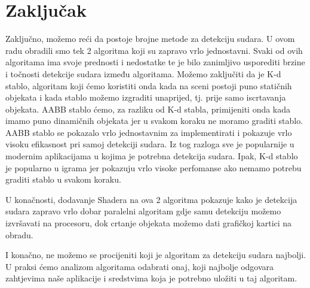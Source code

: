 \chapter{Zaključak}

Zaključno, možemo reći da postoje brojne metode za detekciju sudara. U ovom radu
obradili smo tek 2 algoritma koji su zapravo vrlo jednostavni. Svaki od ovih algoritama ima svoje prednosti i nedostatke te je bilo zanimljivo usporediti brzine i točnosti detekcije sudara između algoritama. Možemo zaključiti da je K-d stablo, algoritam koji ćemo koristiti onda kada na sceni postoji puno statičnih objekata i kada stablo možemo izgraditi unaprijed, tj. prije samo iscrtavanja objekata. AABB stablo ćemo, za razliku od K-d stabla, primijeniti onda kada imamo puno dinamičnih objekata jer u svakom koraku ne moramo graditi stablo. AABB stablo se pokazalo vrlo jednostavnim za implementirati i pokazuje vrlo visoku efikasnost pri samoj detekciji sudara. Iz tog razloga sve je popularnije u modernim aplikacijama u kojima je potrebna detekcija sudara. Ipak, K-d stablo je popularno u igrama jer pokazuju vrlo visoke perfomanse ako nemamo potrebu graditi stablo u svakom koraku. 

U konačnosti, dodavanje Shadera na ova 2 algoritma pokazuje kako je detekcija sudara zapravo vrlo dobar paralelni algoritam gdje samu detekciju možemo izvršavati na procesoru, dok crtanje objekata možemo dati grafičkoj kartici na obradu. 

I konačno, ne možemo se procijeniti koji je algoritam za detekciju sudara najbolji. U praksi ćemo analizom algoritama odabrati onaj, koji najbolje odgovara zahtjevima naše aplikacije i sredstvima koja je potrebno uložiti u taj algoritam. 